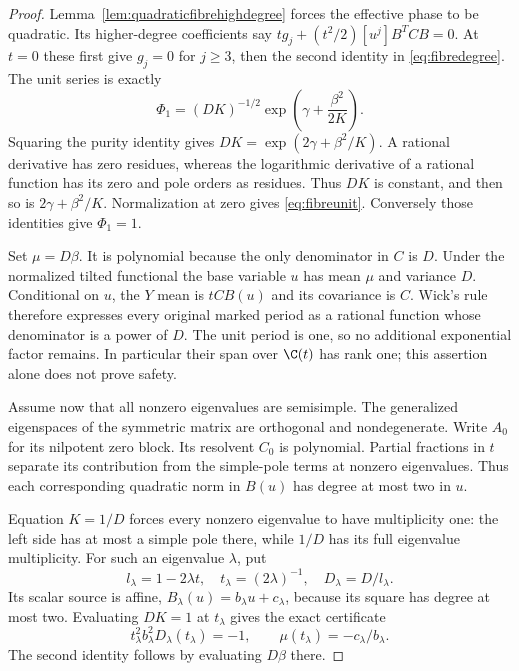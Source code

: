 \begin{proof}
Lemma~\ref{lem:quadraticfibrehighdegree} forces the effective
phase to be quadratic. Its higher-degree coefficients say
$tg_j+(t^2/2)[u^j]B^TCB=0$. At $t=0$ these first give $g_j=0$
for $j\ge3$, then the second identity in
\eqref{eq:fibredegree}. The unit series is exactly
\[
 \Phi_1=(DK)^{-1/2}\exp\!\left(\gamma+\frac{\beta^2}{2K}\right).
\]
Squaring the purity identity gives
$DK=\exp(2\gamma+\beta^2/K)$. A rational derivative has zero
residues, whereas the logarithmic derivative of a rational
function has its zero and pole orders as residues. Thus $DK$
is constant, and then so is $2\gamma+\beta^2/K$.
Normalization at zero gives
\eqref{eq:fibreunit}. Conversely those identities give
$\Phi_1=1$.

Set $\mu=D\beta$. It is polynomial because the only denominator
in $C$ is $D$. Under the normalized tilted functional the base
variable $u$ has mean $\mu$ and variance $D$. Conditional on
$u$, the $Y$ mean is $tCB(u)$ and its covariance is $C$.
Wick's rule therefore expresses every original marked period
as a rational function whose denominator is a power of $D$.
The unit period is one, so no additional exponential factor
remains. In particular their span over $\C(t)$ has rank one;
this assertion alone does not prove safety.

Assume now that all nonzero eigenvalues are semisimple. The
generalized eigenspaces of the symmetric matrix are orthogonal
and nondegenerate. Write $A_0$ for its nilpotent zero block.
Its resolvent $C_0$ is polynomial. Partial fractions in $t$
separate its contribution from the simple-pole terms at
nonzero eigenvalues. Thus each corresponding quadratic norm
in $B(u)$ has degree at most two in $u$.

Equation $K=1/D$ forces every nonzero eigenvalue to have
multiplicity one: the left side has at most a simple pole
there, while $1/D$ has its full eigenvalue multiplicity.
For such an eigenvalue $\lambda$, put
\[
 l_\lambda=1-2\lambda t,\quad t_\lambda=(2\lambda)^{-1},
 \quad D_\lambda=D/l_\lambda.
\]
Its scalar source is affine, $B_\lambda(u)=b_\lambda u+c_\lambda$,
because its square has degree at most two. Evaluating $DK=1$
at $t_\lambda$ gives the exact certificate
\begin{equation}\label{eq:fibrepolecertificate}
 t_\lambda^2b_\lambda^2D_\lambda(t_\lambda)=-1,
 \qquad
 \mu(t_\lambda)=-c_\lambda/b_\lambda.
\end{equation}
The second identity follows by evaluating $D\beta$ there.


\end{proof}
